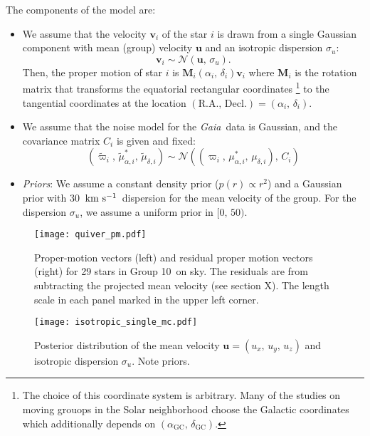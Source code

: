 \documentclass[modern,letterpaper]{aastex61}
\newcommand{\project}[1]{\textsl{#1}}
\newcommand{\gaia}{\project{Gaia}}
\newcommand{\groupTen}{Group 10}
\newcommand{\normal}{{\mathcal{N}}}
\newcommand{\bs}[1]{\boldsymbol{#1}}
\newcommand{\mat}[1]{\mathbf{#1}}
\renewcommand{\vec}[1]{\bs{#1}}
\newcommand{\kms}{\ensuremath{\rm km~s^{-1}}}
\newcommand{\todo}[1]{{\color{crimson}#1}}
\begin{document}
The components of the model are:
\begin{itemize}
  \item We assume that the velocity $\vec{v}_i$ of the star $i$ is drawn from
    a single Gaussian component with mean (group) velocity $\vec{u}$ and
    an isotropic dispersion $\sigma_{u}$:
    $$\vec{v}_i \sim \normal(\vec{u},\,\sigma_{u}).$$
    Then, the proper motion of star $i$ is $\mat{M}_i(\alpha_i,\,\delta_i)\vec{v}_i$ where
    $\mat{M}_i$ is the rotation matrix that transforms the equatorial rectangular coordinates
    \footnote{The choice of this coordinate system is arbitrary. Many of the studies on
      moving grouops in the Solar neighborhood choose the Galactic coordinates which additionally
      depends on $(\alpha_\mathrm{GC},\,\delta_\mathrm{GC})$.
    }
    to the tangential coordinates at the location $(\mathrm{R.A.},\,\mathrm{Decl.}) = (\alpha_i,\,\delta_i)$.

  \item We assume that the noise model for the \gaia\ data is Gaussian, and
    the covariance matrix $C_i$ is given and fixed:
    $$(\tilde\varpi_i,\,\tilde\mu_{\alpha,i}^*,\,\tilde\mu_{\delta,i}) \sim
      \normal((\varpi_i,\,\mu_{\alpha,i}^*,\,\mu_{\delta,i}),\,C_i)$$

  \item \emph{Priors}: We assume a constant density prior ($p(r) \propto r^2$) and a Gaussian
    prior with 30~\kms\ dispersion for the mean velocity of the group.
    For the dispersion $\sigma_u$, we assume a uniform prior in $[0,\,50)$.
\end{itemize}


\begin{figure}
  \centering
  \texttt{[image: quiver\_pm.pdf]}
  \caption{Proper-motion vectors (left) and residual proper motion vectors (right)
    for 29 stars in \groupTen\ on sky.
    The residuals are from subtracting the projected mean velocity (\todo{see section X}).
    The length scale in each panel marked in the upper left corner.
  }
  \label{fig:quiver_pm}
\end{figure}

\begin{figure}
  \centering
  \texttt{[image: isotropic\_single\_mc.pdf]}
  \caption{
    Posterior distribution of the mean velocity $\vec{u} = (u_x,\,u_y,\,u_z)$ and
    isotropic dispersion $\sigma_u$.
    Note priors.
  }
  \label{fig:fit}
\end{figure}
\end{document}
